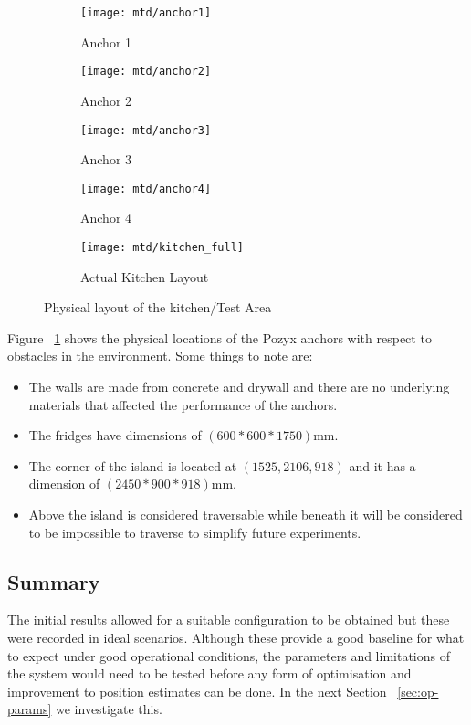 \begin{figure}[h!]
    \centering
    \begin{subfigure}[b]{0.4\textwidth}
            \texttt{[image: mtd/anchor1]}
            \caption{Anchor 1}
    \end{subfigure}
    \begin{subfigure}[b]{0.4\textwidth}
            \texttt{[image: mtd/anchor2]}
            \caption{Anchor 2}
    \end{subfigure}

    \begin{subfigure}[b]{0.4\textwidth}
            \texttt{[image: mtd/anchor3]}
            \caption{Anchor 3}
    \end{subfigure}
    \begin{subfigure}[b]{0.4\textwidth}
            \texttt{[image: mtd/anchor4]}
            \caption{Anchor 4}
    \end{subfigure}

    \begin{subfigure}[b]{0.7\textwidth}
            \texttt{[image: mtd/kitchen\_full]}
            \caption{Actual Kitchen Layout}
    \end{subfigure}
    \caption{Physical layout of the kitchen/Test Area}
    \label{fig:kitchen}
\end{figure}
\medskip
Figure ~\ref{fig:kitchen} shows the physical locations of the Pozyx anchors with respect to obstacles in the environment.
Some things to note are:
\begin{itemize}
    \item The walls are made from concrete and drywall and there are no underlying materials that affected the performance of the anchors.
    \item The fridges have dimensions of $(600*600*1750)$mm.
    \item The corner of the island is located at $(1525,2106,918)$ and it has a dimension of $(2450*900*918)$mm.
    \item Above the island is considered traversable while beneath it will be considered to be impossible to traverse to simplify future experiments.
\end{itemize}

\subsection*{Summary}
The initial results allowed for a suitable configuration to be obtained but these were recorded in ideal scenarios.
Although these provide a good baseline for what to expect under good operational conditions, the parameters and limitations of the system would need to be tested before any form of optimisation
and improvement to position estimates can be done.
In the next Section ~\ref{sec:op-params} we investigate this.

\newpage

\newpage
